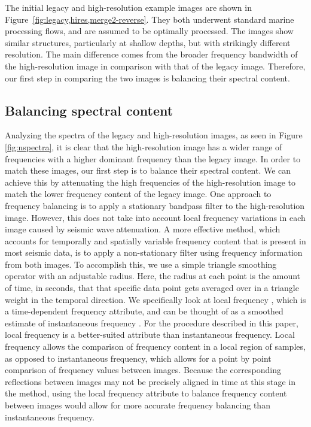     The initial legacy and high-resolution example images are shown in Figure~\ref{fig:legacy,hires,merge2-reverse}. 
    They both underwent standard marine processing flows, and are assumed to be optimally processed.
    The images show similar structures, particularly at shallow depths, but with strikingly different resolution. 
    The main difference comes from the broader frequency bandwidth of the high-resolution image in comparison with that of the legacy image. 
    Therefore, our first step in comparing the two images is balancing their spectral content.

\subsection{Balancing spectral content}

    Analyzing the spectra of the legacy and high-resolution images, as seen in Figure \ref{fig:nspectra}, it is clear that the high-resolution image has a wider range of frequencies with a higher dominant frequency than the legacy image. 
    In order to match these images, our first step is to balance their spectral content. 
    We can achieve this by attenuating the high frequencies of the high-resolution image to match the lower frequency content of the legacy image. 
    One approach to frequency balancing is to apply a stationary bandpass filter to the high-resolution image. 
    However, this does not take into account local frequency variations in each image caused by seismic wave attenuation.
    A more effective method, which accounts for temporally and spatially variable frequency content that is present in most seismic data, is to apply a non-stationary filter using frequency information from both images. 
    To accomplish this, we use a simple triangle smoothing operator with an adjustable radius. 
    Here, the radius at each point is the amount of time, in seconds, that that specific data point gets averaged over in a triangle weight in the temporal direction.
    We specifically look at local frequency \cite[]{attr}, which is a time-dependent frequency attribute, and can be thought of as a smoothed estimate of instantaneous frequency \cite[]{white}. 
    For the procedure described in this paper, local frequency is a better-suited attribute than instantaneous frequency.
    Local frequency allows the comparison of frequency content in a local region of samples, as opposed to instantaneous frequency, which allows for a point by point comparison of frequency values between images. 
    Because the corresponding reflections between images may not be precisely aligned in time at this stage in the method, using the local frequency attribute to balance frequency content between images would allow for more accurate frequency balancing than instantaneous frequency. 
    
